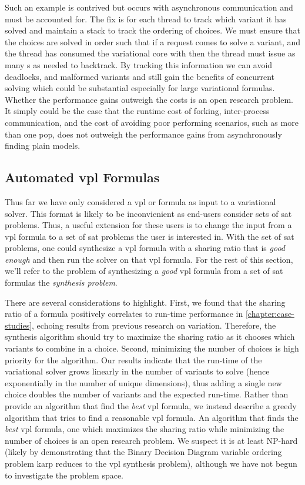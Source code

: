 Such an example is contrived but occurs with asynchronous communication and must
be accounted for. The fix is for each thread to track which variant it has
solved and maintain a stack to track the ordering of choices. We must ensure
that the choices are solved in order such that if a request comes to solve a
 variant, and the thread has consumed the variational core with
 then the thread must issue as many s as needed to
backtrack. By tracking this information we can avoid deadlocks, and malformed
variants and still gain the benefits of concurrent solving which could be
substantial especially for large variational formulas. Whether the performance
gains outweigh the costs is an open research problem. It simply could be the
case that the runtime cost of forking, inter-process communication, and the cost
of avoiding poor performing scenarios, such as more than one pop, does not
outweigh the performance gains from asynchronously finding plain models.

\subsection{Automated \ac{vpl} Formulas}
Thus far we have only considered a \ac{vpl} or \evpl{} formula as input to a
variational solver. This format is likely to be inconvienient as end-users
consider sets of \ac{sat} problems. Thus, a useful extension for these users is
to change the input from a \ac{vpl} formula to a set of \ac{sat} problems the
user is interested in. With the set of \ac{sat} problems, one could synthesize a
\ac{vpl} formula with a sharing ratio that is \emph{good enough} and then run
the solver on that \ac{vpl} formula. For the rest of this section, we'll refer
to the problem of synthesizing a \emph{good} \ac{vpl} formula from a set of
\ac{sat} formulas the \emph{synthesis problem}.

There are several considerations to highlight. First, we found that the sharing
ratio of a formula positively correlates to run-time performance in
\autoref{chapter:case-studies}, echoing results from previous research on
variation. Therefore, the synthesis algorithm should try to maximize the sharing
ratio as it chooses which variants to combine in a choice. Second, minimizing
the number of choices is high priority for the algorithm. Our results indicate
that the run-time of the variational solver grows linearly in the number of
variants to solve (hence exponentially in the number of unique dimensions), thus
adding a single new choice doubles the number of variants and the expected
run-time. Rather than provide an algorithm that find the \emph{best} \ac{vpl}
formula, we instead describe a greedy algorithm that tries to find a reasonable
\ac{vpl} formula. An algorithm that finds the \emph{best} \ac{vpl} formula,
\eg{} one which maximizes the sharing ratio while minimizing the number of
choices is an open research problem. We suspect it is at least NP-hard (likely
by demonstrating that the Binary Decision Diagram variable ordering problem karp
reduces to the \ac{vpl} synthesis problem), although we have not begun to
investigate the problem space.


